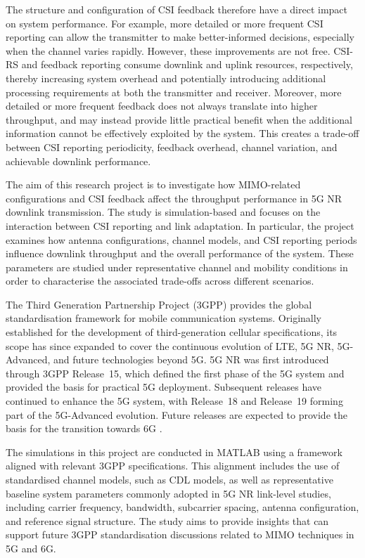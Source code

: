 \documentclass[a4paper,12pt,onecolumn]{article}
\begin{document}
	The structure and configuration of CSI feedback therefore have a direct impact on system performance. For example, more detailed or more frequent CSI reporting can allow the transmitter to make better-informed decisions, especially when the channel varies rapidly. However, these improvements are not free. CSI-RS and feedback reporting consume downlink and uplink resources, respectively, thereby increasing system overhead and potentially introducing additional processing requirements at both the transmitter and receiver. Moreover, more detailed or more frequent feedback does not always translate into higher throughput, and may instead provide little practical benefit when the additional information cannot be effectively exploited by the system. This creates a trade-off between CSI reporting periodicity, feedback overhead, channel variation, and achievable downlink performance.

	The aim of this research project is to investigate how MIMO-related configurations and CSI feedback affect the throughput performance in 5G NR downlink transmission. The study is simulation-based and focuses on the interaction between CSI reporting and link adaptation. In particular, the project examines how antenna configurations, channel models, and CSI reporting periods influence downlink throughput and the overall performance of the system. These parameters are studied under representative channel and mobility conditions in order to characterise the associated trade-offs across different scenarios.


	The Third Generation Partnership Project (3GPP) provides the global standardisation framework for mobile communication systems. Originally established for the development of third-generation cellular specifications, its scope has since expanded to cover the continuous evolution of LTE, 5G NR, 5G-Advanced, and future technologies beyond 5G. 5G NR was first introduced through 3GPP Release~15, which defined the first phase of the 5G system and provided the basis for practical 5G deployment. Subsequent releases have continued to enhance the 5G system, with Release~18 and Release~19 forming part of the 5G-Advanced evolution. Future releases are expected to provide the basis for the transition towards 6G \cite{3GPP}.
	
	The simulations in this project are conducted in MATLAB using a framework aligned with relevant 3GPP specifications. This alignment includes the use of standardised channel models, such as CDL models, as well as representative baseline system parameters commonly adopted in 5G NR link-level studies, including carrier frequency, bandwidth, subcarrier spacing, antenna configuration, and reference signal structure. The study aims to provide insights that can support future 3GPP standardisation discussions related to MIMO techniques in 5G and 6G. 
\end{document}
